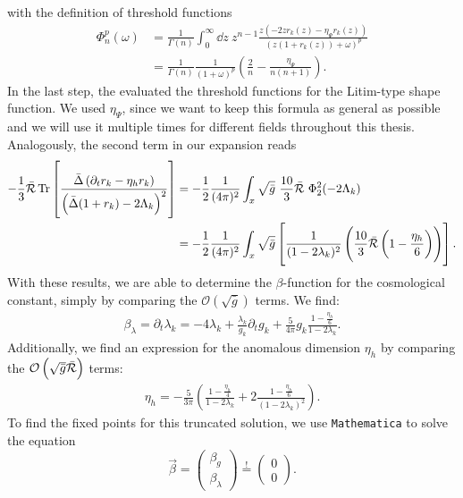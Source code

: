 with the definition of threshold functions 
\begin{equation}
\begin{aligned}
	\Phi_n^p(\omega) &= \frac{1}{\Gamma(n)}\int_0^{\infty}\dd z \ z^{n-1} \frac{z(-2zr_k(z)-\eta_{\Psi}r_k(z))}{(z(1+r_k(z))+\omega)^p}\\[10pt] 
	&= \frac{1}{\Gamma(n)}\frac{1}{\left(1+\omega\right)^p}\left(\frac{2}{n} - \frac{\eta_{\Psi}}{n(n+1)}\right).
\end{aligned}
\label{eqn:threshold}
\end{equation}
In the last step, the evaluated the threshold functions for the Litim-type shape function. We used $\eta_\Psi$, since we want to keep this formula as general as possible and we will use it multiple times for different fields throughout this thesis. Analogously, the second term in our expansion reads
\begin{align}
	-\frac{1}{3}\bar{\mathcal{R}}\operatorname{Tr}\left[\frac{\bar{\Delta}\left(\partial_t r_k - \eta_h r_k\right)}{\left(\bar{\Delta}(1+r_k)-2\Lambda_k\right)^2}\right] &= -\frac{1}{2}\frac{1}{(4\pi)^2}\int_x \sqrt{\bar{g}} \ \frac{10}{3}\bar{\Ricci}\ \Phi_2^2(-2\Lambda_k)\\
	&=  -\frac{1}{2}\frac{1}{(4\pi)^2}\int_x \sqrt{\bar{g}}\left[\frac{1}{(1-2\lambda_k)^2}\left( \frac{10}{3}\bar{\Ricci}\left(1-\frac{\eta_h}{6}\right)\right)\right].\nonumber
\end{align}
With these results, we are able to determine the $\beta$-function for the cosmological constant, simply by comparing the $\mathcal{O}\left(\sqrt{\bar{g}}\right)$ terms. We find:
\begin{align}
	\beta_{\lambda} = \partial_t\lambda_k = -4\lambda_k + \frac{\lambda_k}{g_k} \partial_t g_k + \frac{5}{4\pi}g_k\frac{1-\frac{\eta_h}{6}}{1-2\lambda_k}.
\end{align}
Additionally, we find an expression for the anomalous dimension $\eta_h$ by comparing the $\mathcal{O}\left(\sqrt{\bar{g}}\bar{\mathcal{R}}\right)$ terms:
\begin{align}
\eta_h = -\frac{5}{3\pi} \left(\frac{1-\frac{\eta_h}{4}}{1-2\lambda_k} + 2\frac{1-\frac{\eta_h}{6}}{(1-2\lambda_k)^2}\right).	
\end{align}
To find the fixed points for this truncated solution, we use \verb|Mathematica| to solve the equation
\begin{equation}
	\vec{\beta} = \begin{pmatrix}\beta_g\\ \beta_{\lambda}\end{pmatrix} \overset{!}{=}  \begin{pmatrix}0\\ 0\end{pmatrix}.
\end{equation}
